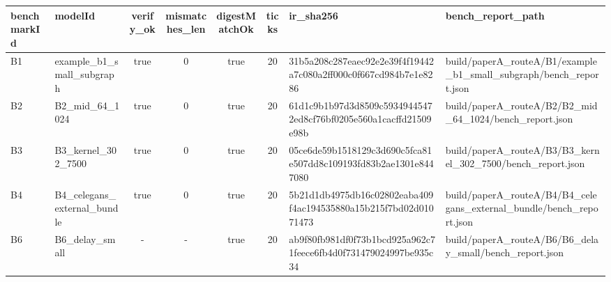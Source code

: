 \begin{tabular}{|l|l|c|c|c|c|l|l|}
\hline
benchmarkId & modelId & verify\_ok & mismatches\_len & digestMatchOk & ticks & ir\_sha256 & bench\_report\_path \\
\hline
B1 & example\_b1\_small\_subgraph & true & 0 & true & 20 & 31b5a208c287eaec92e2e39f4f19442a7c080a2ff000c0f667cd984b7e1e8286 & build/paperA\_routeA/B1/example\_b1\_small\_subgraph/bench\_report.json \\
B2 & B2\_mid\_64\_1024 & true & 0 & true & 20 & 61d1c9b1b97d3d8509c59349445472ed8cf76bf0205e560a1cacffd21509e98b & build/paperA\_routeA/B2/B2\_mid\_64\_1024/bench\_report.json \\
B3 & B3\_kernel\_302\_7500 & true & 0 & true & 20 & 05ce6de59b1518129c3d690c5fca81e507dd8c109193fd83b2ae1301e8447080 & build/paperA\_routeA/B3/B3\_kernel\_302\_7500/bench\_report.json \\
B4 & B4\_celegans\_external\_bundle & true & 0 & true & 20 & 5b21d1db4975db16c02802eaba409f4ac194535880a15b215f7bd02d01071473 & build/paperA\_routeA/B4/B4\_celegans\_external\_bundle/bench\_report.json \\
B6 & B6\_delay\_small & - & - & true & 20 & ab9f80fb981df0f73b1bcd925a962c71feece6fb4d0f731479024997be935c34 & build/paperA\_routeA/B6/B6\_delay\_small/bench\_report.json \\
\hline
\end{tabular}

